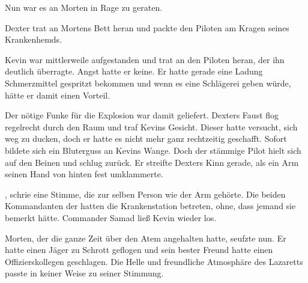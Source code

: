 \par

Nun war es an Morten in Rage zu geraten. 

\par

Dexter trat an Mortens Bett heran und packte den Piloten am Kragen seines Krankenhemds. 

\par

Kevin war mittlerweile aufgestanden und trat an den Piloten heran, der ihn deutlich überragte. Angst hatte er keine. Er hatte gerade eine Ladung Schmerzmittel gespritzt bekommen und wenn es eine Schlägerei geben würde, hätte er damit einen Vorteil. 

\par

Der nötige Funke für die Explosion war damit geliefert. Dexters Faust flog regelrecht durch den Raum und traf Kevins Gesicht. Dieser hatte versucht, sich weg zu ducken, doch er hatte es nicht mehr ganz rechtzeitig geschafft. Sofort bildete sich ein Bluterguss an Kevins Wange. Doch der stämmige Pilot hielt sich auf den Beinen und schlug zurück. Er streifte Dexters Kinn gerade, als ein Arm seinen Hand von hinten fest umklammerte.

\par

, schrie eine Stimme, die zur selben Person wie der Arm gehörte. Die beiden Kommandanten der  hatten die Krankenstation betreten, ohne, dass jemand sie bemerkt hätte. Commander Samad ließ Kevin wieder los. 

\par

Morten, der die ganze Zeit über den Atem angehalten hatte, seufzte nun. Er hatte einen Jäger zu Schrott geflogen und sein bester Freund hatte einen Offizierskollegen geschlagen. Die Helle und freundliche Atmosphäre des Lazaretts passte in keiner Weise zu seiner Stimmung.

\par

